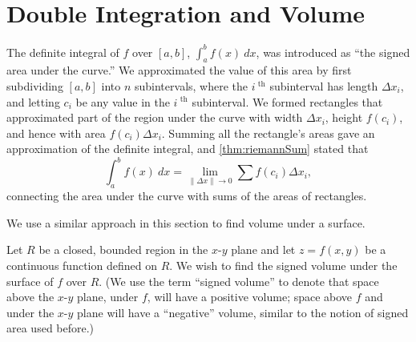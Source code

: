 \section{Double Integration and Volume}\label{sec:double_int_volume}

The definite integral of $f$ over $[a,b]$, $\int_a^b f(x)\ dx$, was introduced as ``the signed area under the curve.'' We approximated the value of this area by first subdividing $[a,b]$ into $n$ subintervals, where the $i^\text{ th}$ subinterval has length $\Delta x_i$, and letting $c_i$ be any value in the $i^\text{ th}$ subinterval. We formed rectangles that approximated part of the region under the curve with width $\Delta x_i$, height $f(c_i)$, and hence with area $f(c_i)\Delta x_i$. Summing all the rectangle's areas gave an approximation of the definite integral, and \autoref{thm:riemannSum} stated that
\[\int_a^bf(x)\ dx = \lim_{\|\Delta x\|\to 0}\sum f(c_i)\Delta x_i,\]
connecting the area under the curve with sums of the areas of rectangles.\bigskip

We use a similar approach in this section to find volume under a surface.\bigskip

Let $R$ be a closed, bounded region in the $x$-$y$ plane and let $z=f(x,y)$ be a continuous function defined on $R$. We wish to find the signed volume under the surface of $f$ over $R$. (We use the term ``signed volume'' to denote that space above the $x$-$y$ plane, under $f$, will have a positive volume; space above $f$ and under the $x$-$y$ plane will have a ``negative'' volume, similar to the notion of signed area used before.)


